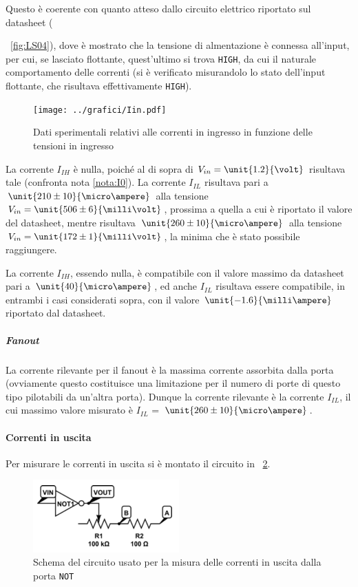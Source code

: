 \documentclass[a4paper,10pt]{article}
\def\code#1{\texttt{#1}}
\begin{document}
Questo è coerente con quanto atteso dallo circuito elettrico riportato sul datasheet (\figurename{~\ref{fig:LS04}), dove è mostrato che la tensione di almentazione è connessa all'input, per cui, se lasciato flottante, quest'ultimo si trova \code{HIGH}, da cui il naturale comportamento delle correnti (si è verificato misurandolo lo stato dell'input flottante, che risultava effettivamente \code{HIGH}).

\begin{figure}[H]
	\centering
	\texttt{[image: ../grafici/Iin.pdf]}
	\caption{Dati sperimentali relativi alle correnti in ingresso in funzione delle tensioni in ingresso}
	\label{fig:Iin}
\end{figure}

La corrente $I_{IH}$ è nulla, poiché al di sopra di $V_{in} = \unit{1.2}{\volt}$ risultava tale (confronta nota \ref{nota:I0}). La corrente $I_{IL}$ risultava pari a $\unit{210 \pm 10}{\micro\ampere}$ alla tensione $V_{in} = \unit{506 \pm 6}{\milli\volt}$, prossima a quella a cui è riportato il valore del datasheet, mentre risultava $\unit{260 \pm 10}{\micro\ampere}$ alla tensione $V_{in} = \unit{172 \pm 1}{\milli\volt}$, la minima che è stato possibile raggiungere.

La corrente $I_{IH}$, essendo nulla, è compatibile con il valore massimo da datasheet pari a $\unit{40}{\micro\ampere}$, ed anche $I_{IL}$ risultava essere compatibile, in entrambi i casi considerati sopra, con il valore $\unit{-1.6}{\milli\ampere}$ riportato dal datasheet.

\subparagraph{Fanout} La corrente rilevante per il fanout è la massima corrente assorbita dalla porta (ovviamente questo costituisce una limitazione per il numero di porte di questo tipo pilotabili da un'altra porta).
Dunque la corrente rilevante è la corrente $I_{IL}$, il cui massimo valore misurato è $I_{IL}$ = $\unit{260 \pm 10}{\micro\ampere}$.


\paragraph{Correnti in uscita} Per misurare le correnti in uscita si è montato il circuito in \figurename{~\ref{fig:NOTout}}.

\begin{figure}[H]
	\centering
	\includegraphics[width=0.5\textwidth]{../grafici/NOTout.png}
	\caption{Schema del circuito usato per la misura delle correnti in uscita dalla porta \code{NOT}}
	\label{fig:NOTout}
\end{figure}

}
\end{document}
